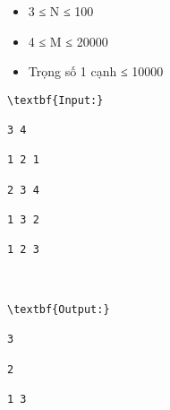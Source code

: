 \begin{itemize}
	\item 3 ≤ N ≤ 100
	\item 4 ≤ M ≤ 20000
	\item Trọng số 1 cạnh ≤ 10000
\end{itemize}
\begin{verbatim}
\textbf{Input:}

3 4

1 2 1

2 3 4

1 3 2

1 2 3



\textbf{Output:}

3

2

1 3

\end{verbatim}